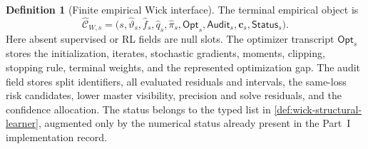 \documentclass[11pt]{article}
\numberwithin{section}{part}
\theoremstyle{plain}
\theoremstyle{definition}
\newtheorem{definition}[definition]{Definition}
\theoremstyle{remark}
\begin{document}
\begin{definition}[Finite empirical Wick interface]
The terminal empirical object is
\begin{equation}
 \label{eq:wick-empirical-record}
 \widehat{\mathscr C}_{W,s}
 =\bigl(s,\widehat\vartheta_s,\widehat f_s,\widehat q_s,
        \widehat\pi_s,\mathsf{Opt}_s,\mathsf{Audit}_s,
        \mathbf c_s,\mathsf{Status}_s\bigr).
\end{equation}
Here absent supervised or RL fields are null slots.  The optimizer transcript
\(\mathsf{Opt}_s\) stores the initialization, iterates, stochastic gradients,
moments, clipping, stopping rule, terminal weights, and the represented
optimization gap.  The audit field stores split identifiers, all evaluated
residuals and intervals, the same-loss risk candidates, lower master
visibility, precision and solve residuals, and the confidence allocation.
The status belongs to the typed list in
\cref{def:wick-structural-learner}, augmented only by the numerical status
already present in the Part~I implementation record.
\end{definition}
\end{document}
